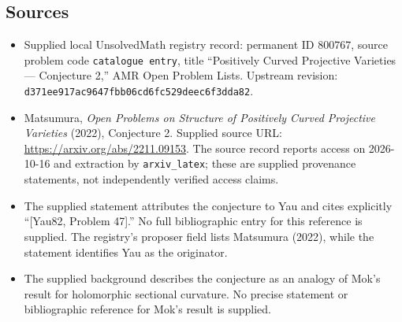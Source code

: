 \documentclass[11pt]{article}
\begin{document}
\subsection{Sources}
\begin{itemize}
\item Supplied local UnsolvedMath registry record: permanent ID \(800767\), source problem code \texttt{catalogue entry}, title ``Positively Curved Projective Varieties --- Conjecture 2,'' AMR Open Problem Lists. Upstream revision: \texttt{d371ee917ac9647fbb06cd6fc529deec6f3dda82}.
\item Matsumura, \emph{Open Problems on Structure of Positively Curved Projective Varieties} (2022), Conjecture 2. Supplied source URL: \url{https://arxiv.org/abs/2211.09153}. The source record reports access on 2026-10-16 and extraction by \texttt{arxiv\_latex}; these are supplied provenance statements, not independently verified access claims.
\item The supplied statement attributes the conjecture to Yau and cites explicitly ``[Yau82, Problem 47].'' No full bibliographic entry for this reference is supplied. The registry's proposer field lists Matsumura (2022), while the statement identifies Yau as the originator.
\item The supplied background describes the conjecture as an analogy of Mok's result for holomorphic sectional curvature. No precise statement or bibliographic reference for Mok's result is supplied.
\end{itemize}
\end{document}
